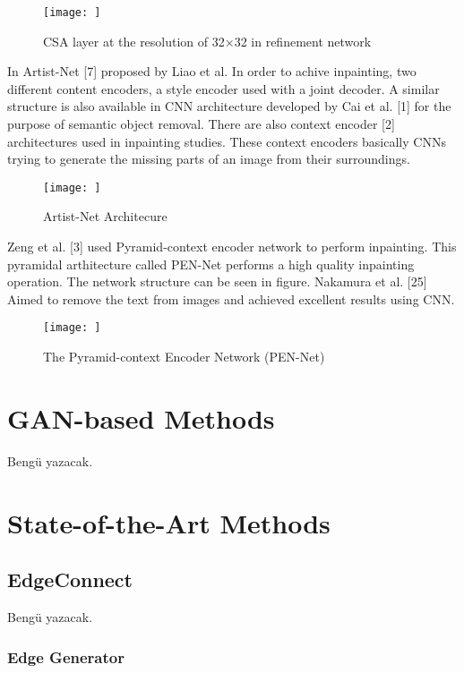 \begin{figure}[h]
    \centering
    \texttt{[image: ]}
    \caption{CSA layer at the resolution of 32×32 in refinement network}
    \label{fig:my_label}
\end{figure}

In Artist-Net [7] proposed by Liao et al. In order to achive inpainting, two different content encoders, a style encoder used with a joint decoder. A similar structure is also available in CNN architecture developed by Cai et al. [1] for the purpose of semantic object removal. There are also context encoder [2] architectures used in inpainting studies. These context encoders basically CNNs trying to generate the missing parts of an image from their surroundings.

\begin{figure}[h]
    \centering
    \texttt{[image: ]}
    \caption{Artist-Net Architecure}
    \label{fig:my_label}
\end{figure}

Zeng et al. [3] used Pyramid-context encoder network to perform inpainting. This pyramidal arthitecture called PEN-Net performs a high quality inpainting operation. The network structure can be seen in figure. Nakamura et al. [25] Aimed to remove the text from images and achieved excellent results using CNN.

\begin{figure}[h]
    \centering
    \texttt{[image: ]}
    \caption{The Pyramid-context Encoder Network (PEN-Net)}
    \label{fig:my_label}
\end{figure}

\section{GAN-based Methods}

Bengü yazacak.

\section{State-of-the-Art Methods}

\subsection{EdgeConnect}

Bengü yazacak.

\subsubsection{Edge Generator}

